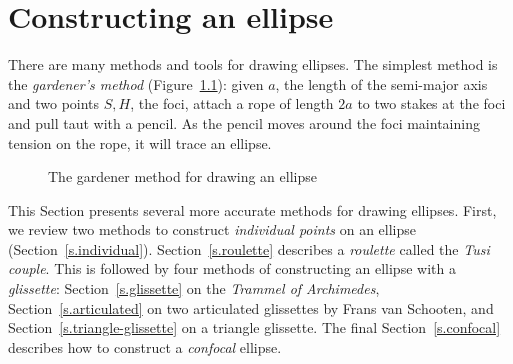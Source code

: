 
\chapter{Constructing an ellipse}\label{s.constructing}

There are many methods and tools for drawing ellipses. The simplest method is the \emph{gardener's method} (Figure~\ref{f.gardener}): given $a$, the length of the semi-major axis and two points $S,H$, the foci, attach a rope of length $2a$ to two stakes at the foci and pull taut with a pencil. As the pencil moves around the foci maintaining tension on the rope, it will trace an ellipse.


\begin{figure}[b]
\begin{center}
\caption{The gardener method for drawing an ellipse}\label{f.gardener}
\end{center}
\end{figure}


This Section presents several more accurate methods for drawing ellipses. First, we review two methods to construct \emph{individual points} on an ellipse (Section~\ref{s.individual}).  Section~\ref{s.roulette} describes a \emph{roulette} called the \emph{Tusi couple}. This is followed by four methods of constructing an ellipse with a \emph{glissette}: Section~\ref{s.glissette} on the \emph{Trammel of Archimedes}, Section~\ref{s.articulated} on two articulated glissettes by Frans van Schooten, and Section~\ref{s.triangle-glissette} on a triangle glissette. The final Section~\ref{s.confocal} describes how to construct a \emph{confocal} ellipse.

